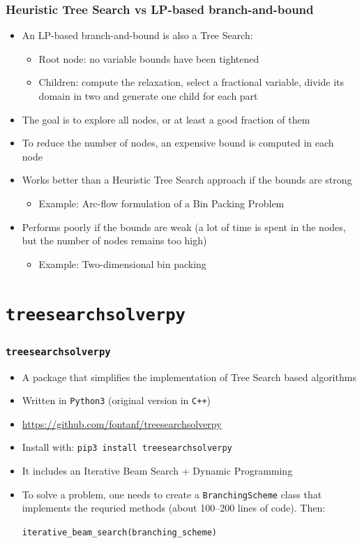 \documentclass[10pt]{beamer}
\begin{document}
\begin{frame}
  \frametitle{Heuristic Tree Search vs LP-based branch-and-bound}

  \begin{itemize}
    \pause
    \item An LP-based branch-and-bound is also a Tree Search:
      \begin{itemize}
        \item Root node: no variable bounds have been tightened
        \item Children: compute the relaxation, select a fractional variable, divide its domain in two and generate one child for each part
      \end{itemize}
    \pause
    \item The goal is to explore all nodes, or at least a good fraction of them
    \pause
    \item To reduce the number of nodes, an expensive bound is computed in each node
    \pause
    \item Works better than a Heuristic Tree Search approach if the bounds are strong
      \begin{itemize}
        \item Example: Arc-flow formulation of a Bin Packing Problem
      \end{itemize}
    \pause
    \item Performs poorly if the bounds are weak (a lot of time is spent in the nodes, but the number of nodes remains too high)
      \begin{itemize}
        \item Example: Two-dimensional bin packing
      \end{itemize}
  \end{itemize}
\end{frame}


\section{\texttt{treesearchsolverpy}}

\begin{frame}
  \frametitle{\texttt{treesearchsolverpy}}

  \begin{itemize}
    \item A package that simplifies the implementation of Tree Search based algorithms
    \item Written in \texttt{Python3} (original version in \texttt{C++})
    \item \url{https://github.com/fontanf/treesearchsolverpy}
    \item Install with: \texttt{pip3 install treesearchsolverpy}
    \item It includes an Iterative Beam Search + Dynamic Programming
    \item To solve a problem, one needs to create a \texttt{BranchingScheme} class that implements the requried methods (about 100--200 lines of code). Then:

      \texttt{iterative\_beam\_search(branching\_scheme)}
  \end{itemize}
\end{frame}
\end{document}
